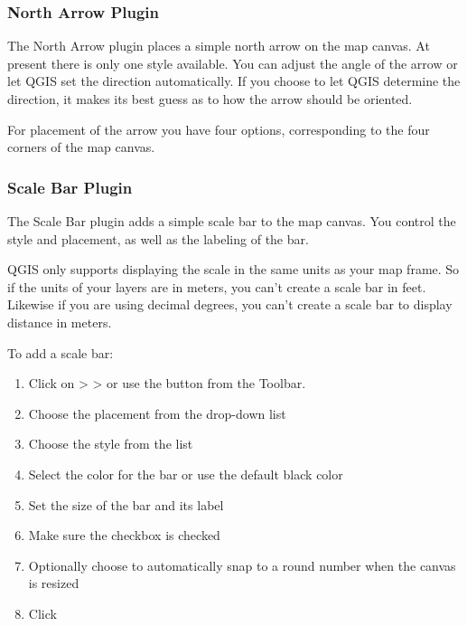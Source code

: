 \subsubsection{North Arrow Plugin}

The North Arrow plugin places a simple north arrow on the map canvas. At
present there is only one style available. You can adjust the angle of the
arrow or let QGIS set the direction automatically. If you choose to let
QGIS determine the direction, it makes its best guess as to how the arrow
should be oriented.

For placement of the arrow you have four options, corresponding to the four 
corners of the map canvas.


\subsubsection{Scale Bar Plugin}
The Scale Bar plugin adds a simple scale bar to the map canvas. You
control the style and placement, as well as the labeling of the bar. 

QGIS only supports displaying the scale in the same units as your map frame. So
if the units of your layers are in meters, you can't create a scale bar in
feet. Likewise if you are using decimal degrees, you can't create a scale
bar to display distance in meters.

To add a scale bar:

\begin{enumerate}
\item Click on  >  >  or use the  button from the Toolbar.
\item Choose the placement from the  drop-down list
\item Choose the style from the  list
\item Select the color for the bar  or use the default black color
\item Set the size of the bar and its label 
\item Make sure the  checkbox is checked
\item Optionally choose to automatically snap to a round number when the
  canvas is resized 
\item Click  
\end{enumerate} 

